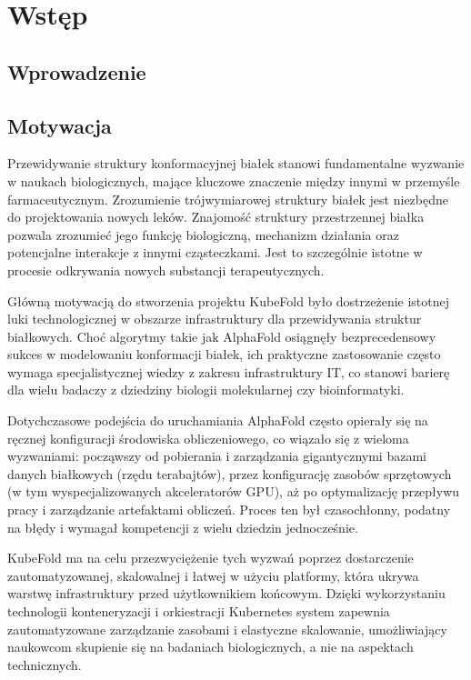 \chapter{Wstęp}


\section{Wprowadzenie}


\section{Motywacja}

Przewidywanie struktury konformacyjnej białek stanowi fundamentalne wyzwanie w naukach biologicznych, mające kluczowe znaczenie między innymi w przemyśle farmaceutycznym.
Zrozumienie trójwymiarowej struktury białek jest niezbędne do projektowania nowych leków.
Znajomość struktury przestrzennej białka pozwala zrozumieć jego funkcję biologiczną, mechanizm działania oraz potencjalne interakcje z innymi cząsteczkami.
Jest to szczególnie istotne w procesie odkrywania nowych substancji terapeutycznych.

Główną motywacją do stworzenia projektu KubeFold było dostrzeżenie istotnej luki technologicznej w obszarze infrastruktury dla przewidywania struktur białkowych.
Choć algorytmy takie jak AlphaFold osiągnęły bezprecedensowy sukces w modelowaniu konformacji białek, ich praktyczne zastosowanie często wymaga specjalistycznej wiedzy z zakresu infrastruktury IT, co stanowi barierę dla wielu badaczy z dziedziny biologii molekularnej czy bioinformatyki.

Dotychczasowe podejścia do uruchamiania AlphaFold często opierały się na ręcznej konfiguracji środowiska obliczeniowego, co wiązało się z wieloma wyzwaniami: począwszy od pobierania i zarządzania gigantycznymi bazami danych białkowych (rzędu terabajtów), przez konfigurację zasobów sprzętowych (w tym wyspecjalizowanych akceleratorów GPU), aż po optymalizację przepływu pracy i zarządzanie artefaktami obliczeń.
Proces ten był czasochłonny, podatny na błędy i wymagał kompetencji z wielu dziedzin jednocześnie.

KubeFold ma na celu przezwyciężenie tych wyzwań poprzez dostarczenie zautomatyzowanej, skalowalnej i łatwej w użyciu platformy, która ukrywa warstwę infrastruktury przed użytkownikiem końcowym.
Dzięki wykorzystaniu technologii konteneryzacji i orkiestracji Kubernetes system zapewnia zautomatyzowane zarządzanie zasobami i elastyczne skalowanie, umożliwiający naukowcom skupienie się na badaniach biologicznych, a nie na aspektach technicznych.


